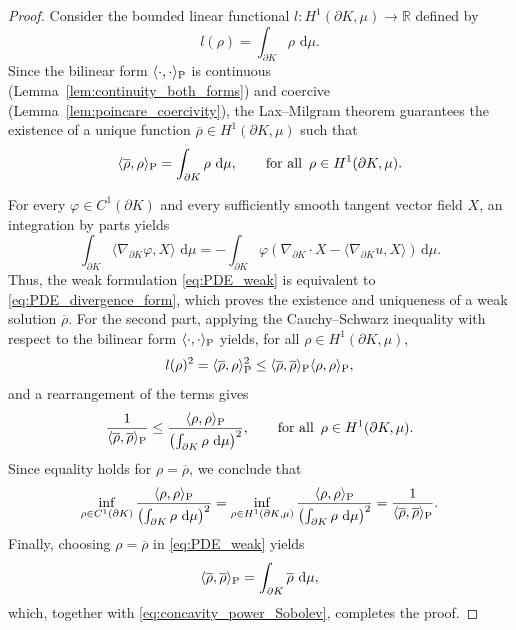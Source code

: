 \documentclass[a4paper, 11pt]{article}
\theoremstyle{definition}
\newcommand{\di}{\, \mathrm{d}}
\begin{document}
\begin{proof}
Consider the bounded linear functional $l : H^{1}(\partial K,\mu) \to \mathbb{R}$ defined by
\[l(\rho) = \int_{\partial K} \rho\,\di\mu.\]
Since the bilinear form $\langle \cdot,\cdot \rangle_{\rm P}$ is continuous (Lemma~\ref{lem:continuity_both_forms}) and coercive (Lemma~\ref{lem:poincare_coercivity}), the Lax--Milgram theorem guarantees the existence of a unique function $\overline{\rho} \in H^{1}(\partial K,\mu)$ such that
\begin{equation}\label{eq:PDE_weak}
\langle \overline{\rho}, \rho \rangle_{\rm P}= \int_{\partial K}\rho\,\di\mu,\qquad \text{for all} \,\,\, \rho \in H^{1}(\partial K,\mu).
\end{equation}

For every $\varphi \in C^{1}(\partial K)$ and every sufficiently smooth tangent vector field $X$, an integration by parts yields
\[\int_{\partial K} \langle \nabla_{\partial K}\varphi , X \rangle \,\di\mu=-\int_{\partial K} \varphi\left(\nabla_{\partial K} \cdot X-\langle \nabla_{\partial K}u,X \rangle\right)\di\mu.\]
Thus, the weak formulation \eqref{eq:PDE_weak} is equivalent to \eqref{eq:PDE_divergence_form}, which proves the existence and uniqueness of a weak solution $\overline{\rho}$. For the second part, applying the Cauchy--Schwarz inequality with respect to the bilinear form $\langle \cdot,\cdot \rangle_{\rm P}$ yields, for all $\rho \in H^{1}(\partial K,\mu)$,
\[l(\rho)^2=\langle \overline{\rho}, \rho \rangle_{\rm P}^2\leq\langle \overline{\rho}, \overline{\rho} \rangle_{\rm P}\langle \rho, \rho \rangle_{\rm P},\]
and a rearrangement of the terms gives
\begin{equation}\label{eq:Lax_Cauchy}
\frac{1}{\langle \overline{\rho}, \overline{\rho} \rangle_{\rm P}}
\leq
\frac{\langle \rho, \rho \rangle_{\rm P}}{\left(\int_{\partial K}\rho\,\di\mu\right)^2},
\qquad
\text{for all} \,\,\, \rho \in H^{1}(\partial K,\mu).
\end{equation}
Since equality holds for $\rho=\overline{\rho}$, we conclude that
\[\inf_{\rho \in C^{1}(\partial K)}\frac{\langle \rho,\rho \rangle_{\rm P}}{\left(\int_{\partial K}\rho\,\di\mu\right)^2}=\inf_{\rho \in H^{1}(\partial K,\mu)}\frac{\langle \rho,\rho \rangle_{\rm P}}{\left(\int_{\partial K}\rho\,\di\mu\right)^2}=\frac{1}{\langle \overline{\rho}, \overline{\rho} \rangle_{\rm P}}.\]
Finally, choosing $\rho=\overline{\rho}$ in \eqref{eq:PDE_weak} yields
\[\langle \overline{\rho}, \overline{\rho} \rangle_{\rm P}=\int_{\partial K}\overline{\rho}\,\di\mu,\]
which, together with \eqref{eq:concavity_power_Sobolev}, completes the proof.
\end{proof}
\end{document}
